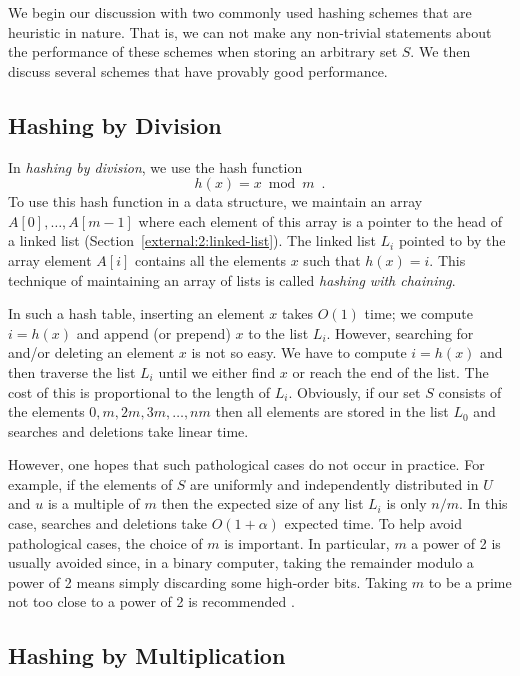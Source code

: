 We begin our discussion with two commonly used hashing schemes that
are heuristic in nature.  That is, we can not make any non-trivial
statements about the performance of these schemes when storing an
arbitrary set $S$.  We then discuss several schemes that have provably
good performance.

\subsection{Hashing by Division}

In \emph{hashing by division}, we use the hash function
\[ h(x) = x\bmod m \enspace . \]
To use this hash function in a data structure, we maintain an array
$A[0],\ldots,A[m-1]$ where each element of this array is a pointer to
the head of a linked list (Section~\ref{external:2:linked-list}).  The
linked list $L_i$ pointed to by the array element $A[i]$ contains all
the elements $x$ such that $h(x)=i$.  This technique of maintaining an
array of lists is called \emph{hashing with
chaining}.

In such a hash table, inserting an element $x$ takes $O(1)$ time;  we
compute $i=h(x)$ and append (or prepend) $x$ to the list $L_i$.
However, searching for and/or deleting an element $x$ is not so easy.
We have to compute $i=h(x)$ and then traverse the list $L_i$ until we
either find $x$ or reach the end of the list.  The cost of this is
proportional to the length of $L_i$.  Obviously, if our set $S$
consists of the elements $0,m,2m,3m,\ldots,nm$ then all elements are
stored in the list $L_0$ and searches and deletions take linear time.

However, one hopes that such pathological cases do not occur in
practice. For example, if the elements of $S$ are uniformly and
independently distributed in $U$ and $u$ is a multiple of $m$ then the
expected size of any list $L_i$ is only $n/m$.  In this case, searches
and deletions take $O(1+\alpha)$ expected time.  To help avoid
pathological cases, the choice of $m$ is important.  In particular,
$m$ a power of 2 is usually avoided since, in a binary computer,
taking the remainder modulo a power of 2 means simply discarding some
high-order bits.  Taking $m$ to be a prime not too close to a power of
2 is recommended \cite{k97}.

\subsection{Hashing by Multiplication}

